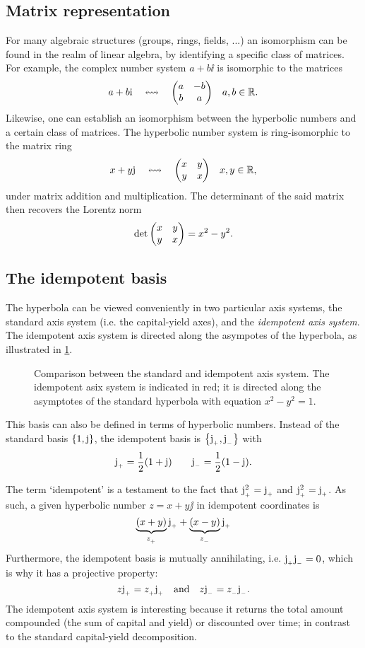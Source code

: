 \subsection{Matrix representation}
For many algebraic structures (groups, rings, fields, ...) an isomorphism can be found in the realm of linear algebra, by identifying a specific class of matrices. For example, the complex number system \(a + b\ii\) is isomorphic to the matrices
\[
     a + b\ii \corresponds \mqty(a & -b \\ b & a) \quad a, b \in \real.
\]
Likewise, one can establish an isomorphism between the hyperbolic numbers and a certain class of matrices. The hyperbolic number system is ring-isomorphic to the matrix ring
\[
     x + y\jj \corresponds \mqty(x & y \\ y & x) \quad x, y \in \real,
\]
under matrix addition and multiplication. The determinant of the said matrix then recovers the Lorentz norm
\[
     \det \mqty(x & y \\ y & x) = x^2 - y^2.
\]

\subsection{The idempotent basis}
The hyperbola can be viewed conveniently in two particular axis systems, the standard axis system (i.e. the capital-yield axes), and the \emph{idempotent axis system}. The idempotent axis system is directed along the asympotes of the hyperbola, as illustrated in \cref{fig:hyperbola_comparison}.
\begin{figure}[h!]
    \centering
    
    \caption{Comparison between the standard and idempotent axis system. The idempotent asix system is indicated in red; it is directed along the asymptotes of the standard hyperbola with equation $x^2 - y^2 = 1$.}
    \label{fig:hyperbola_comparison}
\end{figure}

This basis can also be defined in terms of hyperbolic numbers. Instead of the standard basis \(\qty{1, \ensuremath{\mathrm{j}}}\), the idempotent basis is \(\qty{\ensuremath{\mathrm{j}_{_+}}, \ensuremath{\mathrm{j}_{_-}}}\) with 
\[
     \mathrm{j}_{_+} = \frac{1}{2}(1 + \mathrm{j}) \qquad \mathrm{j}_{_-} = \frac{1}{2}(1 - \mathrm{j}).
\]

The term `idempotent' is a testament to the fact that \(\mathrm{j}_{_+}^2 = \mathrm{j}_{_+}\) and \(\mathrm{j}_{_+}^2 = \mathrm{j}_{_+}\). As such, a given hyperbolic number \(z = x + y\jj\) in idempotent coordinates is 
\[
     \underbrace{\qty(x + y)}_{z_{_+}}\mathrm{j}_{_+} + \underbrace{\qty(x - y)}_{z_{_-}}\mathrm{j}_{_+}
\]
Furthermore, the idempotent basis is mutually annihilating, i.e. \(\mathrm{j}_{_+} \mathrm{j}_{_-} = 0\), which is why it has a projective property: \cite{Sobczyk1995}
\[
     z\mathrm{j}_{_+} = z_{_+}\mathrm{j}_{_+}\quad\text{and}\quad z\mathrm{j}_{_-} = z_{_-}\mathrm{j}_{_-}.
\]
The idempotent axis system is interesting because it returns the total amount compounded (the sum of capital and yield) or discounted over time; in contrast to the standard capital-yield decomposition.

